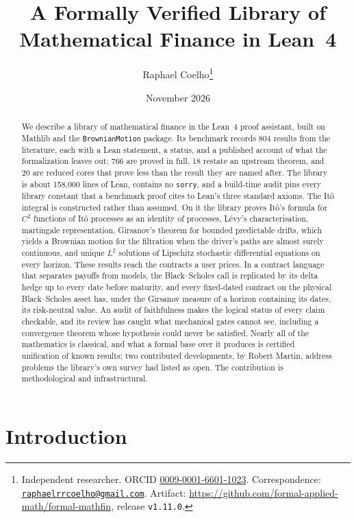 \documentclass[11pt]{article}
\title{A Formally Verified Library of\\ Mathematical Finance in Lean~4}
\author{Raphael Coelho\thanks{Independent researcher. ORCID
  \href{https://orcid.org/0009-0001-6601-1023}{0009-0001-6601-1023}.
  Correspondence: \href{mailto:raphaelrrcoelho@gmail.com}{\texttt{raphaelrrcoelho@gmail.com}}.
  Artifact: \url{https://github.com/formal-applied-math/formal-mathfin}, release \texttt{v1.11.0}.}}
\date{November 2026}
\begin{document}
\maketitle

\begin{abstract}
\noindent
We describe a library of mathematical finance in the Lean~4 proof assistant, built on Mathlib and the
\texttt{BrownianMotion} package. Its benchmark records 804 results from the literature, each with a Lean
statement, a status, and a published account of what the formalization leaves out: 766 are proved in full,
18 restate an upstream theorem, and 20 are reduced cores that prove less than the result they are named
after. The library is about 158,000 lines of Lean, contains no \texttt{sorry}, and a build-time audit pins
every library constant that a benchmark proof cites to Lean's three standard axioms. The It\^o integral is
constructed rather than assumed. On it the library proves It\^o's formula for $C^2$ functions of It\^o
processes as an identity of processes, L\'evy's characterisation, martingale representation, Girsanov's theorem for bounded predictable drifts, which yields a Brownian motion for the filtration when the driver's paths are almost surely continuous, and unique
$L^2$ solutions of Lipschitz stochastic differential equations on every horizon. These results reach the
contracts a user prices. In a contract language that separates payoffs from models, the Black--Scholes call
is replicated by its delta hedge up to every date before maturity, and every fixed-dated contract on the
physical Black--Scholes asset has, under the Girsanov measure of a horizon containing its dates, its risk-neutral value. An audit of faithfulness makes the
logical status of every claim checkable, and its review has caught what mechanical gates cannot see,
including a convergence theorem whose hypothesis could never be satisfied. Nearly all of the mathematics is
classical, and what a formal base over it produces is certified unification of known results; two
contributed developments, by Robert Martin, address problems the library's own survey had listed as open.
The contribution is methodological and infrastructural.
\end{abstract}

\section{Introduction}
\end{document}
